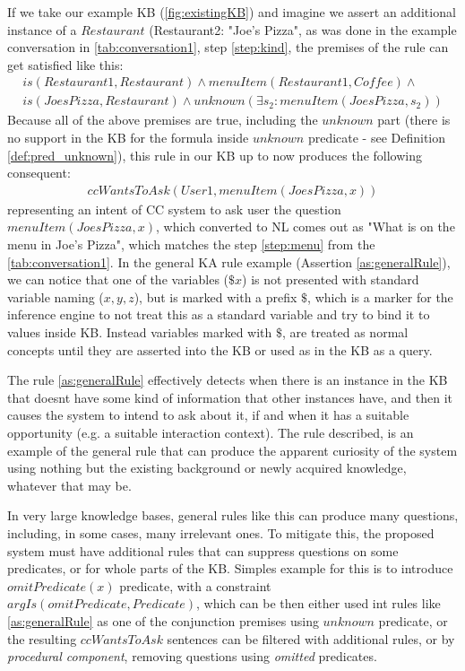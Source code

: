 If we take our example KB (\autoref{fig:existingKB}) and imagine we assert
an additional instance of a $Restaurant$ (Restaurant2: "Joe’s Pizza", as was 
done in the example conversation in \autoref{tab:conversation1}, 
step \ref{step:kind}, the premises of the rule can get satisfied like this:
\begin{equation}\label{as:generalRuleantecedent}
\begin{gathered}
is(Restaurant1,Restaurant) \land menuItem(Restaurant1,Coffee)\land \\
	is(JoesPizza,Restaurant) \land unknown(\exists s_2:menuItem(JoesPizza,s_2))
\end{gathered}
\end{equation}
Because all of the above premises are true, including the $unknown$ part
(there is no support in the KB for the formula inside $unknown$ predicate - see 
Definition \autoref{def:pred_unknown}), this rule in our KB up to now produces the 
following consequent:
\begin{equation}\label{as:generalRuleConsequent}
\begin{gathered}
	ccWantsToAsk(User1,menuItem(JoesPizza,x))
\end{gathered}
\end{equation}
representing an intent of CC system to ask user the question 
$menuItem(JoesPizza,x)$, which converted to NL comes out as "What is on the menu
in Joe's Pizza", which matches the step \ref{step:menu} from the 
\autoref{tab:conversation1}. In the general KA rule example (Assertion 
\ref{as:generalRule}), we can notice that one of the variables ($\$x$) is not 
presented with standard variable naming ($x,y,z$), but is marked with a prefix 
$\$$, which is a marker for the inference engine to not treat this as a standard
variable and try to bind it to values inside KB. Instead variables marked with
$\$$, are treated as normal concepts until they are asserted into the KB or used
as in the KB as a query. 

The rule \ref{as:generalRule} effectively detects when there is an instance in 
the KB that doesnt have some kind of information that other instances have, and
then it causes the system to intend to ask about it, if and when it has a 
suitable opportunity (e.g. a suitable interaction context). The rule described,
is an example of the general rule that can produce the apparent curiosity of 
the system using nothing but the existing background or newly acquired 
knowledge, whatever that may be.

In very large knowledge bases, general rules like this can produce many 
questions, including, in some cases, many irrelevant ones. To mitigate this, the
proposed system must have additional rules that can suppress questions on some 
predicates, or for whole parts of the KB. Simples example for this is to 
introduce $omitPredicate(x)$ predicate, with a constraint 
$argIs(omitPredicate,Predicate)$, which can be then either used int rules like
\ref{as:generalRule} as one of the conjunction premises using $unknown$
predicate, or the resulting $ccWantsToAsk$ sentences can be filtered with
additional rules, or by \emph{procedural component}, removing questions
using \emph{omitted} predicates.

